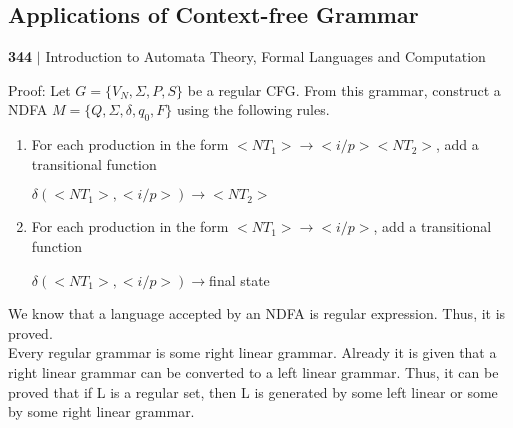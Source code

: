 \documentclass[a4,9pt]{beamer}
\begin{document}
\begin{frame}
\section*{Applications of Context-free Grammar}
 \begin{flushleft}
    \textbf{344}\hspace*{0.1cm} \textbf{$|$} \hspace*{0.1cm} Introduction to Automata Theory, Formal Languages and Computation
  \end{flushleft}
\vspace*{0.5cm}

Proof: Let $G = \{V_{N}, \Sigma, P, S \}$ be a regular CFG. From this grammar, construct a NDFA $M = \{Q, \Sigma, \delta,
q_{0}, F\}$ using the following rules.\\
\vspace*{0.2cm}

\begin{enumerate}
  \item For each production in the form $<NT_{1}> \rightarrow <i/p> <NT_{2}>$, add a transitional function\\
  
  \begin{center}
    $\delta(<NT_{1}>, <i/p>) \rightarrow <NT_{2}>$ \\
  \end{center}
  
  \item For each production in the form $<NT_{1} > \rightarrow <i/p>$, add a transitional function \\
  
  \begin{center}
    $\delta(<NT_{1}>, <i/p>) \rightarrow $final state \\
  \end{center}
\end{enumerate}

\vspace*{0.2cm}
\small{
We know that a language accepted by an NDFA is regular expression. Thus, it is proved.\\
\hspace*{0.5cm} Every regular grammar is some right linear grammar. Already it is given that a right linear grammar
can be converted to a left linear grammar. Thus, it can be proved that if L is a regular set, then L is
generated by some left linear or some by some right linear grammar.\\
}

\vspace*{0.4cm}
\end{frame}
\end{document}
